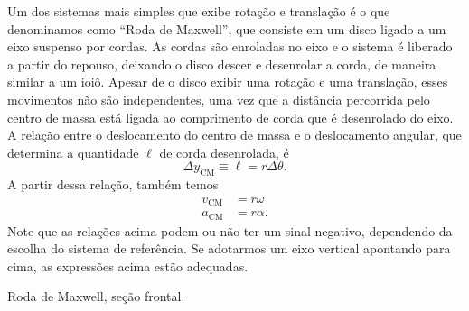 Um dos sistemas mais simples que exibe rotação e translação é o que denominamos como ``Roda de Maxwell'', que consiste em um disco ligado a um eixo suspenso por cordas. As cordas são enroladas no eixo e o sistema é liberado a partir do repouso, deixando o disco descer e desenrolar a corda, de maneira similar a um ioiô. Apesar de o disco exibir uma rotação e uma translação, esses movimentos não são independentes, uma vez que a distância percorrida pelo centro de massa está ligada ao comprimento de corda que é desenrolado do eixo. A relação entre o deslocamento do centro de massa e o deslocamento angular, que determina a quantidade $\ell$ de corda desenrolada, é
\begin{equation}
    \Delta y_{\text{CM}} \equiv \ell = r \Delta \theta.
\end{equation}
%
A partir dessa relação, também temos
\begin{align}
    v_{\text{CM}} &= r \omega \\
    a_{\text{CM}} &= r \alpha.
\end{align}
%
Note que as relações acima podem ou não ter um sinal negativo, dependendo da escolha do sistema de referência. Se adotarmos um eixo vertical apontando para cima, as expressões acima estão adequadas.

\begin{marginfigure}[7.5cm]
    \centering
    \caption{Roda de Maxwell, seção frontal.\label{Fig:RodaDeMaxwellSecaoFrontal}}
    \end{marginfigure}

